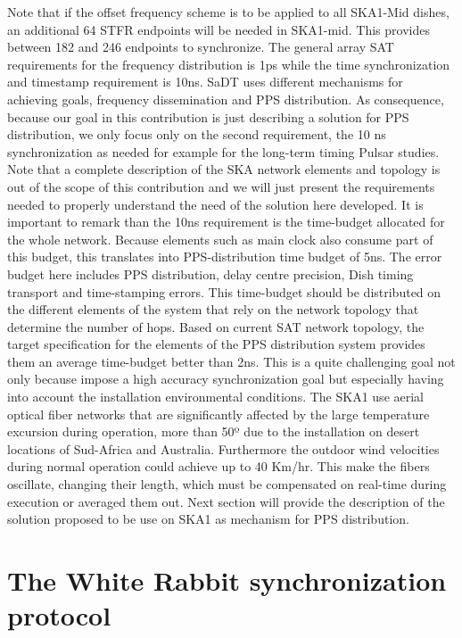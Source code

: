 \documentclass[review]{elsarticle}
\begin{document}
Note that if the offset frequency scheme is to be applied to all SKA1-Mid dishes, an additional 64 STFR endpoints will be needed in SKA1-mid. This provides between 182 and 246 endpoints to synchronize. 
The general array SAT requirements for the frequency distribution is 1ps while the time synchronization and timestamp requirement is 10ns. SaDT uses different mechanisms for achieving goals, frequency dissemination and PPS distribution. As consequence, because our goal in this contribution is just describing a solution for PPS distribution, we only focus only on the second requirement, the 10 ns synchronization as needed for example for the long-term timing Pulsar studies. Note that a complete description of the SKA network elements and topology is out of the scope of this contribution and we will just present the requirements needed to properly understand the need of the solution here developed. 
It is important to remark than the 10ns requirement is the time-budget allocated for the whole network. Because elements such as main clock also consume part of this budget, this translates into PPS-distribution time budget of 5ns. The error budget here includes PPS distribution, delay centre precision, Dish timing transport and time-stamping errors. This time-budget should be distributed on the different elements of the system that rely on the network topology that determine the number of hops. Based on current SAT network topology, the target specification for the elements of the PPS distribution system provides them an average time-budget better than 2ns. This is a quite challenging goal not only because impose a high accuracy synchronization goal but especially having into account the installation environmental conditions. The SKA1 use aerial optical fiber networks that are significantly affected by the large temperature excursion during operation, more than 50º due to the installation on desert locations of Sud-Africa and Australia. Furthermore the outdoor wind velocities during normal operation could achieve up to 40 Km/hr. This make the fibers oscillate, changing their length, which must be compensated on real-time during execution or averaged them out. 
Next section will provide the description of the solution proposed to be use on SKA1 as mechanism for PPS distribution. 

\section{The White Rabbit synchronization protocol}
\end{document}
